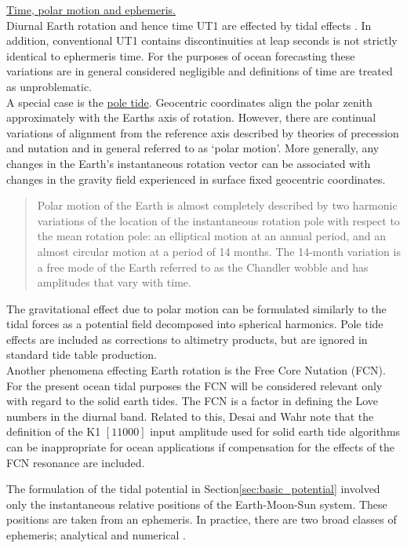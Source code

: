 \underline{Time, polar motion and ephemeris.}\\ 
Diurnal Earth rotation and hence time UT1 are effected by tidal effects \citep[sec 8]{IERS2003}.  In addition, conventional UT1 contains discontinuities at leap seconds is not strictly identical to ephermeris time.  For the purposes of ocean forecasting these variations are in general considered negligible and definitions of time are treated as unproblematic.\\


A special case is the \underline{pole tide}. Geocentric coordinates align the polar zenith approximately with the Earths axis of rotation. However, there are continual variations of alignment from the reference axis described by theories of precession and nutation and in general referred to as `polar motion'.   More generally, any changes in the Earth's instantaneous rotation vector can be associated with changes in the gravity field  experienced in surface fixed geocentric coordinates.\\
\begin{quotation}
Polar motion of the Earth is almost completely described by two harmonic variations of the location of the instantaneous rotation pole with respect to the mean rotation pole: an elliptical motion at an annual period, and an almost circular motion at a period of 14 months. The 14-month variation is a free mode of the Earth referred to as the Chandler wobble and has amplitudes that vary with time. \citep{Desai:2002ev}
\end{quotation}
The gravitational effect due to polar motion can be formulated similarly to the tidal forces as a potential field decomposed into spherical harmonics.
Pole tide effects are included as corrections to altimetry products, but are ignored in standard tide table production.\\
Another phenomena effecting Earth rotation is the Free Core Nutation (FCN).  For the present ocean tidal purposes the FCN will be considered relevant only with regard to the solid earth tides.  The FCN is a factor in defining the  Love numbers in the diurnal band.   Related to this, Desai and Wahr note that the definition of the K1 $[1 1 0 0 0]$ input amplitude used for solid earth tide algorithms can be inappropriate for ocean applications if compensation for the effects of the FCN resonance are included\citep{Desai:1995je}.



The formulation of the tidal potential in Section\ref{sec:basic_potential} involved only the instantaneous relative positions of the Earth-Moon-Sun system.   These positions are taken from an ephemeris.  In practice, there are two broad classes of ephemeris; analytical and numerical \citep{Wenzel:1997kn}.



